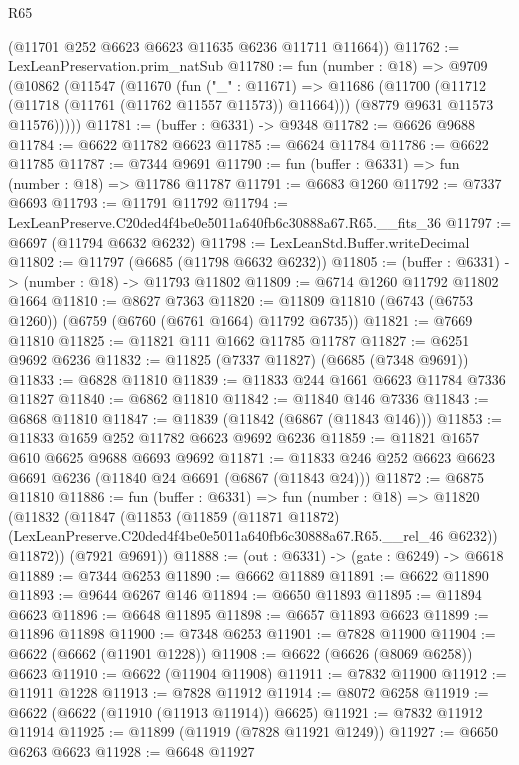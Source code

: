 \begin{lexlean}{R65}
\begin{coremodule}
{      (@11701 @252 @6623 @6623 @11635 @6236 @11711 @11664))
@11762 := LexLeanPreservation.prim_natSub
@11780 := fun (number : @18) =>
  @9709
    (@10862
      (@11547
        (@11670
          (fun ("_" : @11671) =>
          @11686
            (@11700 (@11712 (@11718 (@11761 (@11762 @11557 @11573)) @11664)))
            (@8779 @9631 @11573 @11576)))))
@11781 := (buffer : @6331) -> @9348
@11782 := @6626 @9688
@11784 := @6622 @11782 @6623
@11785 := @6624 @11784
@11786 := @6622 @11785
@11787 := @7344 @9691
@11790 := fun (buffer : @6331) => fun (number : @18) => @11786 @11787
@11791 := @6683 @1260
@11792 := @7337 @6693
@11793 := @11791 @11792
@11794 := LexLeanPreserve.C20ded4f4be0e5011a640fb6c30888a67.R65.__fits_36
@11797 := @6697 (@11794 @6632 @6232)
@11798 := LexLeanStd.Buffer.writeDecimal
@11802 := @11797 (@6685 (@11798 @6632 @6232))
@11805 := (buffer : @6331) -> (number : @18) -> @11793 @11802
@11809 := @6714 @1260 @11792 @11802 @1664
@11810 := @8627 @7363
@11820 := @11809 @11810 (@6743 (@6753 @1260)) (@6759 (@6760 (@6761 @1664) @11792 @6735))
@11821 := @7669 @11810
@11825 := @11821 @111 @1662 @11785 @11787
@11827 := @6251 @9692 @6236
@11832 := @11825 (@7337 @11827) (@6685 (@7348 @9691))
@11833 := @6828 @11810
@11839 := @11833 @244 @1661 @6623 @11784 @7336 @11827
@11840 := @6862 @11810
@11842 := @11840 @146 @7336
@11843 := @6868 @11810
@11847 := @11839 (@11842 (@6867 (@11843 @146)))
@11853 := @11833 @1659 @252 @11782 @6623 @9692 @6236
@11859 := @11821 @1657 @610 @6625 @9688 @6693 @9692
@11871 := @11833 @246 @252 @6623 @6623 @6691 @6236 (@11840 @24 @6691 (@6867 (@11843 @24)))
@11872 := @6875 @11810
@11886 := fun (buffer : @6331) =>
  fun (number : @18) =>
  @11820
    (@11832
      (@11847
        (@11853
          (@11859
            (@11871 @11872)
            (LexLeanPreserve.C20ded4f4be0e5011a640fb6c30888a67.R65.__rel_46 @6232))
          @11872))
      (@7921 @9691))
@11888 := (out : @6331) -> (gate : @6249) -> @6618
@11889 := @7344 @6253
@11890 := @6662 @11889
@11891 := @6622 @11890
@11893 := @9644 @6267 @146
@11894 := @6650 @11893
@11895 := @11894 @6623
@11896 := @6648 @11895
@11898 := @6657 @11893 @6623
@11899 := @11896 @11898
@11900 := @7348 @6253
@11901 := @7828 @11900
@11904 := @6622 (@6662 (@11901 @1228))
@11908 := @6622 (@6626 (@8069 @6258)) @6623
@11910 := @6622 (@11904 @11908)
@11911 := @7832 @11900
@11912 := @11911 @1228
@11913 := @7828 @11912
@11914 := @8072 @6258
@11919 := @6622 (@6622 (@11910 (@11913 @11914)) @6625)
@11921 := @7832 @11912 @11914
@11925 := @11899 (@11919 (@7828 @11921 @1249))
@11927 := @6650 @6263 @6623
@11928 := @6648 @11927
}
\end{coremodule}
\end{lexlean}
